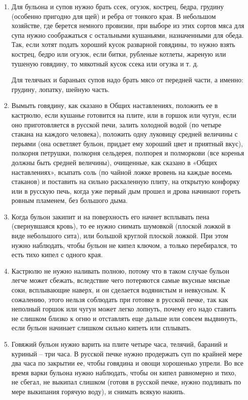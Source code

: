 \begin{enumerate}
	\item  Для бульона и супов нужно брать ссек, огузок, кострец, бедра, грудину (особенно пригодно для щей) и ребра от тонкого края. В небольшом хозяйстве, где берется немного провизии, при выборе из этих сортов мяса для супа нужно соображаться с остальными кушаньями, назначенными для обеда. Так, если хотят подать хороший кусок разварной говядины, то нужно взять кострец, бедро или огузок, если битки, рубленые котлеты, жареную или тушеную говядину, то мякотный кусок ссека или огузка и т. д.

Для телячьих и бараньих супов надо брать мясо от передней части, а именно: грудину, лопатку, шейную часть.
	\item Вымыть говядину, как сказано в Общих наставлениях, положить ее в кастрюлю, если кушанье готовится на плите, или в горшок или чугун, если оно приготовляется в русской печи, залить холодной водой (по четыре стакана на каждого человека), положить одну луковицу средней величины с перьями (она осветляет бульон, придает ему хороший цвет и приятный вкус), полкорня петрушки, полкорня сельдерея, полпорея и полморкови (все коренья должны быть средней величины), очищенные, как сказано в «Общих наставлениях», всыпать соль (по чайной ложке вровень на каждые восемь стаканов) и поставить на сильно раскаленную плиту, на открытую конфорку или в русскую печь, когда уже первый дым прошел и дрова начинают гореть ровным пламенем, без большого дыма.
	\item Когда бульон закипит и на поверхность его начнет всплывать пена (свернувшаяся кровь), то ее нужно снимать шумовкой (плоской ложкой в виде небольшого сита), или большой круглой плоской ложкой. При этом нужно наблюдать, чтобы бульон не кипел ключом, а только перебирался, то есть тихо кипел с одного края.
	\item Кастрюлю не нужно наливать полною, потому что в таком случае бульон легче может сбежать, вследствие чего потеряются самые вкусные мясные соки, всплывающие наверх, и он сделается водянистым и невкусным. К сожалению, этого нельзя соблюдать при готовке в русской печке, так как неполный горшок или чугун может легко лопнуть, почему его надо ставить не слишком близко к огню и отставлять еще дальше или совсем выдвинуть, если бульон начинает слишком сильно кипеть или сплывать.
	\item Говяжий бульон нужно варить на плите четыре часа, телячий, бараний и куриный – три часа. В русской печке нужно продержать суп по крайней мере два часа по закрытии ее, чтобы говядина и овощи хорошенько упрели. Во все время варки бульона нужно наблюдать, чтобы он кипел равномерно и тихо, не сбегал, не выкипал слишком (готовя в русской печке, нужно подливать по мере выкипания горячую воду), и снимать всякую накипь.

\end{enumerate}
